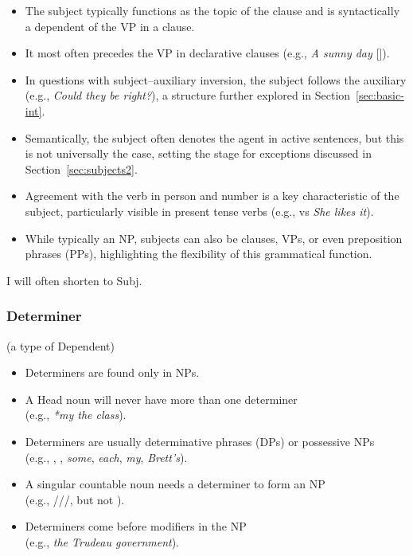 \begin{itemize}[noitemsep]
    \item {}The subject typically functions as the topic of the clause and is syntactically a dependent of the VP in a clause.
    \item It most often precedes the VP in declarative clauses (e.g., \textit{\emph{A sunny day}} []).
    \item In questions with subject--auxiliary inversion, the subject follows the auxiliary (e.g., \textit{Could \emph{they} be right?}), a structure further explored in Section~\ref{sec:basic-int}.
    \item Semantically, the subject often denotes the agent in active sentences, but this is not universally the case, setting the stage for exceptions discussed in Section~\ref{sec:subjects2}.
    \item {}Agreement with the verb in person and number is a key characteristic of the subject, particularly visible in present tense verbs (e.g.,  vs \textit{She like\emph{s} it}).
    \item While typically an NP, subjects can also be clauses, VPs, or even preposition phrases (PPs), highlighting the flexibility of this grammatical function.
\end{itemize}


I will often shorten  to Subj.

\subsubsection{Determiner}\label{sec:determine}
(a type of Dependent)

\begin{itemize}[noitemsep]
    \item {}Determiners are found only in NPs.
    \item A Head noun will never have more than one determiner \\(e.g., \textit{*\emph{my} \emph{the} class}).
    \item Determiners are usually determinative phrases (DPs) or possessive NPs \\(e.g., , , \textit{ some},\textit{ each},\textit{ my},\textit{ Brett's}).
    \item A singular countable noun needs a determiner to form an NP \\(e.g., ///, but not ).
    \item Determiners come before modifiers in the NP \\(e.g., \textit{\emph{the} Trudeau government}).
\end{itemize}

